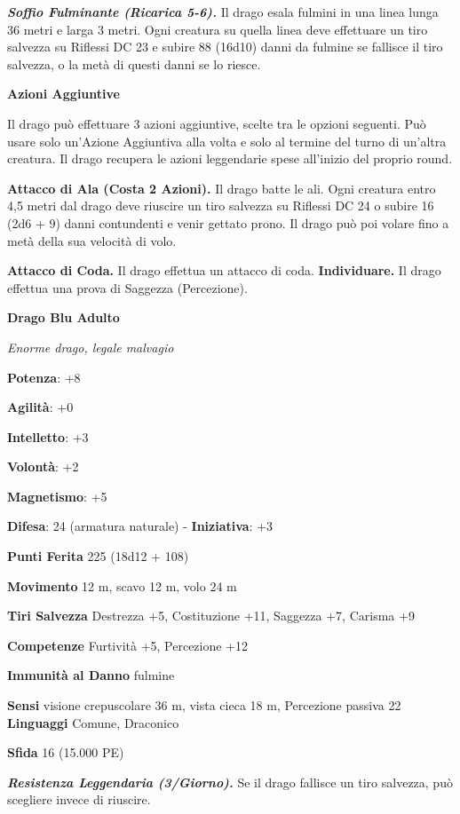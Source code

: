 \begin{multicols}{2}
\emph{\textbf{Soffio Fulminante (Ricarica 5-6).}} Il drago esala fulmini
in una linea lunga 36 metri e larga 3 metri. Ogni creatura su quella
linea deve effettuare un tiro salvezza su Riflessi DC 23 e subire 88
(16d10) danni da fulmine se fallisce il tiro salvezza, o la metà di
questi danni se lo riesce.

\textbf{Azioni Aggiuntive}

Il drago può effettuare 3 azioni aggiuntive, scelte tra le opzioni
seguenti. Può usare solo un'Azione Aggiuntiva alla volta e solo al
termine del turno di un'altra creatura. Il drago recupera le azioni
leggendarie spese all'inizio del proprio round.

\textbf{Attacco di Ala (Costa 2 Azioni).} Il drago batte le ali. Ogni
creatura entro 4,5 metri dal drago deve riuscire un tiro salvezza su Riflessi DC 24 o subire 16 (2d6 + 9) danni contundenti e venir gettato
prono. Il drago può poi volare fino a metà della sua velocità di volo.

\textbf{Attacco di Coda.} Il drago effettua un attacco di coda.
\textbf{Individuare.} Il drago effettua una prova di Saggezza
(Percezione).

\textbf{Drago Blu Adulto}

\emph{Enorme drago, legale malvagio}

\textbf{Potenza}: +8

\textbf{Agilità}: +0

\textbf{Intelletto}: +3

\textbf{Volontà}: +2

\textbf{Magnetismo}: +5

\textbf{Difesa}: 24 (armatura naturale) - \textbf{Iniziativa}: +3

\textbf{Punti Ferita} 225 (18d12 + 108)

\textbf{Movimento} 12 m, scavo 12 m, volo 24 m

\textbf{Tiri Salvezza} Destrezza +5, Costituzione +11, Saggezza +7,
Carisma +9

\textbf{Competenze} Furtività +5, Percezione +12

\textbf{Immunità al Danno} fulmine

\textbf{Sensi} visione crepuscolare 36 m, vista cieca 18 m, Percezione passiva
22 \textbf{Linguaggi} Comune, Draconico

\textbf{Sfida} 16 (15.000 PE)\smallskip

\emph{\textbf{Resistenza Leggendaria (3/Giorno).}} Se il drago fallisce
un tiro salvezza, può scegliere invece di riuscire.


\end{multicols}
